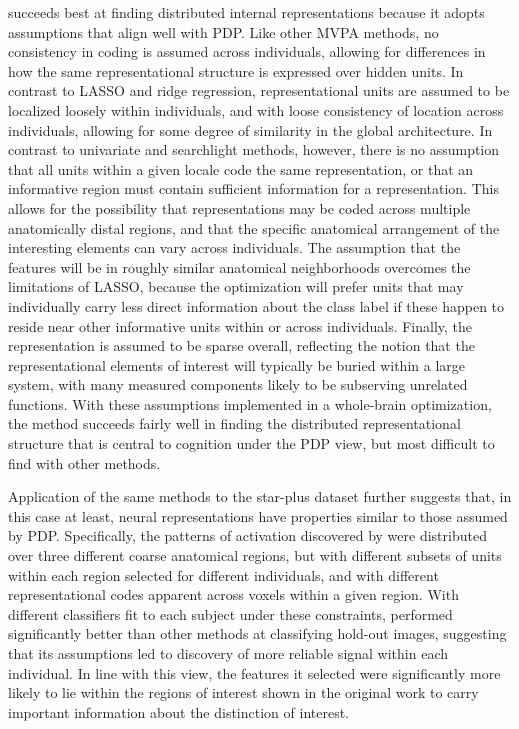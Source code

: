 \soslasso succeeds best at finding distributed internal representations because it adopts assumptions that align well with PDP. Like other MVPA methods, no consistency in coding is assumed across individuals, allowing for differences in how the same representational structure is expressed over hidden units. In contrast to LASSO and ridge regression, representational units are assumed to be localized loosely within individuals, and with loose consistency of location across individuals, allowing for some degree of similarity in the global architecture. In contrast to univariate and searchlight methods, however, there is no assumption that all units within a given locale code the same representation, or that an informative region must contain sufficient information for a representation. This allows for the possibility that representations may be coded across multiple anatomically distal regions, and that the specific anatomical arrangement of the interesting elements can vary across individuals. The assumption that the features will be in roughly similar anatomical neighborhoods overcomes the limitations of LASSO, because the optimization will prefer units that may individually carry less direct information about the class label if these happen to reside near other informative units within or across individuals. Finally, the representation is assumed to be sparse overall, reflecting the notion that the representational elements of interest will typically be buried within a large system, with many measured components likely to be subserving unrelated functions. With these assumptions implemented in a whole-brain optimization, the method succeeds fairly well in finding the distributed representational structure that is central to cognition under the PDP view, but most difficult to find with other methods. 

Application of the same methods to the star-plus dataset further suggests that, in this case at least, neural representations have properties similar to those assumed by PDP. Specifically, the patterns of activation discovered by \soslasso were distributed over three different coarse anatomical regions, but with different subsets of units within each region selected for different individuals, and with different representational codes apparent across voxels within a given region. With different classifiers fit to each subject under these constraints, \soslasso performed significantly better than other methods at classifying hold-out images, suggesting that its assumptions led to discovery of more reliable signal within each individual. In line with this view, the features it selected were significantly more likely to lie within the regions of interest shown in the original work to carry important information about the distinction of interest.  

